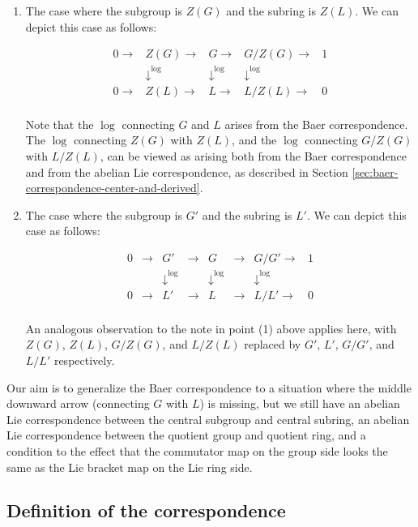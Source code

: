 \documentclass{ucetd}
\begin{document}
\begin{enumerate}
\item The case where the subgroup is $Z(G)$ and the subring is
  $Z(L)$. We can depict this case as follows:

  $$\begin{array}{lllll}
    0 \to & Z(G) \to & G \to & G/Z(G) \to & 1 \\
    & \downarrow^{\log} & \downarrow^{\log} & \downarrow^{\log}&  \\
    0  \to & Z(L) \to & L \to & L/Z(L) \to & 0\\
  \end{array}$$

  Note that the $\log$ connecting $G$ and $L$ arises from the Baer
  correspondence. The $\log$ connecting $Z(G)$ with $Z(L)$, and the
  $\log$ connecting $G/Z(G)$ with $L/Z(L)$, can be viewed as arising
  both from the Baer correspondence and from the abelian Lie
  correspondence, as described in Section
  \ref{sec:baer-correspondence-center-and-derived}.
\item The case where the subgroup is $G'$ and the subring is $L'$. We
  can depict this case as follows:

  $$\begin{array}{lllllllll}
    0 & \to & G' & \to & G & \to & G/G' \to & 1 \\
    && \downarrow^{\log} && \downarrow^{\log} && \downarrow^{\log}&  \\
    0  & \to & L' & \to & L & \to & L/L' \to & 0\\
  \end{array}$$
 
  An analogous observation to the note in point (1) above applies
  here, with $Z(G)$, $Z(L)$, $G/Z(G)$, and $L/Z(L)$ replaced by $G'$,
  $L'$, $G/G'$, and $L/L'$ respectively.
\end{enumerate}

Our aim is to generalize the Baer correspondence to a situation where
the middle downward arrow (connecting $G$ with $L$) is missing, but we
still have an abelian Lie correspondence between the central subgroup
and central subring, an abelian Lie correspondence between the
quotient group and quotient ring, and a condition to the effect that
the commutator map on the group side looks the same as the Lie bracket
map on the Lie ring side.

\subsection{Definition of the correspondence}\label{sec:bcuti-def}
\end{document}
